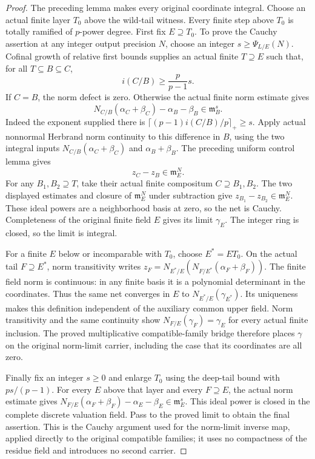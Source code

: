 \begin{proof}
The preceding lemma makes every original coordinate integral.
Choose an actual finite layer $T_0$ above the wild-tail witness.
Every finite step above $T_0$ is totally ramified of $p$-power degree. First fix $E\supseteq T_0$.
To prove the Cauchy assertion at any integer output precision $N$,
choose an integer $s\geq\Psi_{L/E}(N)$.
Cofinal growth of relative first bounds supplies an actual finite
$T\supseteq E$ such that, for all $T\subseteq B\subseteq C$,
\[
 i(C/B)\geq\frac p{p-1}s.
\]
If $C=B$, the norm defect is zero. Otherwise the actual finite
norm estimate gives
\[
 N_{C/B}(\alpha_C+\beta_C)-\alpha_B-\beta_B
 \in\mathfrak m_B^s.
\]
Indeed the exponent supplied there is
$\lceil(p-1)i(C/B)/p\rceil_+\geq s$.
Apply actual nonnormal Herbrand norm continuity to this difference
in $B$, using the two integral inputs
$N_{C/B}(\alpha_C+\beta_C)$ and $\alpha_B+\beta_B$.
The preceding uniform control lemma gives
\[
 z_C-z_B\in\mathfrak m_E^N.
\]
For any $B_1,B_2\supseteq T$, take their actual finite compositum
$C\supseteq B_1,B_2$. The two displayed estimates and closure of
$\mathfrak m_E^N$ under subtraction give
$z_{B_1}-z_{B_2}\in\mathfrak m_E^N$.
These ideal powers are a neighborhood basis at zero, so the net
is Cauchy. Completeness of the original finite field $E$ gives its
limit $\gamma_E$. The integer ring is closed, so the limit is integral.

For a finite $E$ below or incomparable with $T_0$, choose
$E^*=ET_0$. On the actual tail $F\supseteq E^*$, norm transitivity
writes $z_F=N_{E^*/E}(N_{F/E^*}(\alpha_F+\beta_F))$.
The finite field norm is continuous: in any finite basis it is a
polynomial determinant in the coordinates. Thus the same net
converges in $E$ to $N_{E^*/E}(\gamma_{E^*})$.
Its uniqueness makes this definition independent of the auxiliary
common upper field. Norm transitivity and the same continuity show
$N_{F/E}(\gamma_F)=\gamma_E$ for every actual finite inclusion.
The proved multiplicative compatible-family bridge therefore places
$\gamma$ on the original norm-limit carrier, including the case
that its coordinates are all zero.

Finally fix an integer $s\geq0$ and enlarge $T_0$ using the deep-tail
bound with $ps/(p-1)$.
For every $E$ above that layer and every $F\supseteq E$, the actual
norm estimate gives
$N_{F/E}(\alpha_F+\beta_F)-\alpha_E-\beta_E\in\mathfrak m_E^s$.
This ideal power is closed in the complete discrete valuation field.
Pass to the proved limit to obtain the final assertion.
This is the Cauchy argument used for the norm-limit inverse map,
applied directly to the original compatible families; it uses no
compactness of the residue field and introduces no second carrier.
\end{proof}

